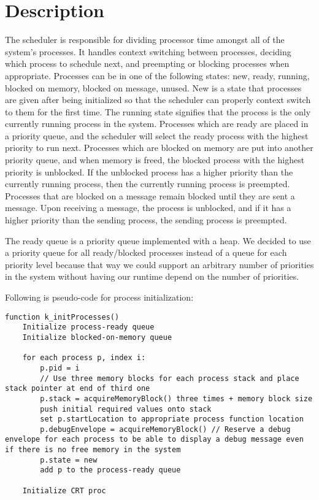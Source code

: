 \documentclass[12pt]{report}
\begin{document}
\section{Description}
The scheduler is responsible for dividing processor time amongst all of the
system's processes. It handles context switching between processes, deciding
which process to schedule next, and preempting or blocking processes when
appropriate. Processes can be in one of the following states: new, ready,
running, blocked on memory, blocked on message, unused. New is a state that
processes are given after being initialized so that the scheduler can properly
context switch to them for the first time. The running state signifies that the
process is the only currently running process in the system. Processes which
are ready are placed in a priority queue, and the scheduler will select the
ready process with the highest priority to run next. Processes which are
blocked on memory are put into another priority queue, and when memory is
freed, the blocked process with the highest priority is unblocked. If the
unblocked process has a higher priority than the currently running process, then
the currently running process is preempted. Processes that are blocked on a
message remain blocked until they are sent a message. Upon receiving a message,
the process is unblocked, and if it has a higher priority than the sending
process, the sending process is preempted.

The ready queue is a priority queue implemented with a heap. We decided to use a
priority queue for all ready/blocked processes instead of a queue for each
priority level because that way we could support an arbitrary number of
priorities in the system without having our runtime depend on the number of
priorities.

Following is pseudo-code for process initialization:
\begin{lstlisting}
function k_initProcesses()
    Initialize process-ready queue
    Initialize blocked-on-memory queue

    for each process p, index i:
        p.pid = i
        // Use three memory blocks for each process stack and place stack pointer at end of third one
        p.stack = acquireMemoryBlock() three times + memory block size 
        push initial required values onto stack
        set p.startLocation to appropriate process function location
        p.debugEnvelope = acquireMemoryBlock() // Reserve a debug envelope for each process to be able to display a debug message even if there is no free memory in the system
        p.state = new
        add p to the process-ready queue

    Initialize CRT proc
\end{lstlisting}
\end{document}
